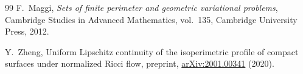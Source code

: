 \documentclass[11pt]{amsart}
\theoremstyle{definition}
\theoremstyle{remark}
\begin{document}
\begin{thebibliography}{99}
F.~Maggi,
\newblock \emph{Sets of finite perimeter and geometric variational problems},
\newblock Cambridge Studies in Advanced Mathematics, vol.~135, Cambridge
University Press, 2012.

Y.~Zheng,
\newblock Uniform Lipschitz continuity of the isoperimetric profile of compact
surfaces under normalized Ricci flow,
\newblock preprint, \href{https://arxiv.org/abs/2001.00341}{arXiv:2001.00341}
(2020).

\end{thebibliography}
\end{document}
